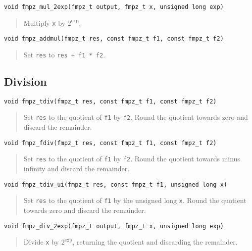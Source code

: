 \documentclass[a4paper,10pt]{article}
\newcommand{\code}{\lstinline}
\begin{document}
\begin{lstlisting}
void fmpz_mul_2exp(fmpz_t output, fmpz_t x, unsigned long exp)
\end{lstlisting}
\begin{quote}
Multiply \code{x} by $2^{\mbox{exp}}$.
\end{quote}

\begin{lstlisting}
void fmpz_addmul(fmpz_t res, const fmpz_t f1, const fmpz_t f2)
\end{lstlisting}
\begin{quote}
Set \code{res} to \code{res + f1 * f2}.
\end{quote}

\subsection{Division}

\begin{lstlisting}
void fmpz_tdiv(fmpz_t res, const fmpz_t f1, const fmpz_t f2)
\end{lstlisting}
\begin{quote}
Set \code{res} to the quotient of \code{f1} by \code{f2}. Round the quotient towards zero and discard the remainder.
\end{quote}

\begin{lstlisting}
void fmpz_fdiv(fmpz_t res, const fmpz_t f1, const fmpz_t f2)
\end{lstlisting}
\begin{quote}
Set \code{res} to the quotient of \code{f1} by \code{f2}. Round the quotient towards minus infinity and discard the remainder.
\end{quote}

\begin{lstlisting}
void fmpz_tdiv_ui(fmpz_t res, const fmpz_t f1, unsigned long x)
\end{lstlisting}
\begin{quote}
Set \code{res} to the quotient of \code{f1} by the unsigned long \code{x}. Round the quotient towards zero and discard the remainder.
\end{quote}

\begin{lstlisting}
void fmpz_div_2exp(fmpz_t output, fmpz_t x, unsigned long exp)
\end{lstlisting}
\begin{quote}
Divide \code{x} by $2^{\mbox{exp}}$, returning the quotient and discarding the remainder.
\end{quote}
\end{document}
